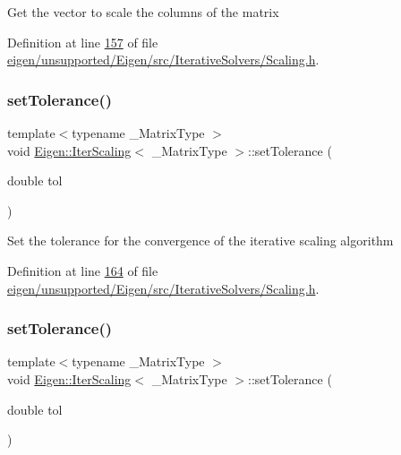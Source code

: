 Get the vector to scale the columns of the matrix 

Definition at line \hyperlink{eigen_2unsupported_2_eigen_2src_2_iterative_solvers_2_scaling_8h_source_l00157}{157} of file \hyperlink{eigen_2unsupported_2_eigen_2src_2_iterative_solvers_2_scaling_8h_source}{eigen/unsupported/\+Eigen/src/\+Iterative\+Solvers/\+Scaling.\+h}.

\mbox{\label{class_eigen_1_1_iter_scaling_acbca5170d8043f40e387bcb6a42f8b71}} 
\subsubsection{\texorpdfstring{set\+Tolerance()}{setTolerance()}\hspace{0.1cm}{\footnotesize\ttfamily [1/2]}}
{\footnotesize\ttfamily template$<$typename \+\_\+\+Matrix\+Type $>$ \\
void \hyperlink{class_eigen_1_1_iter_scaling}{Eigen\+::\+Iter\+Scaling}$<$ \+\_\+\+Matrix\+Type $>$\+::set\+Tolerance (\begin{DoxyParamCaption}\item[{double}]{tol }\end{DoxyParamCaption})\hspace{0.3cm}{\ttfamily [inline]}}

Set the tolerance for the convergence of the iterative scaling algorithm 

Definition at line \hyperlink{eigen_2unsupported_2_eigen_2src_2_iterative_solvers_2_scaling_8h_source_l00164}{164} of file \hyperlink{eigen_2unsupported_2_eigen_2src_2_iterative_solvers_2_scaling_8h_source}{eigen/unsupported/\+Eigen/src/\+Iterative\+Solvers/\+Scaling.\+h}.

\mbox{\label{class_eigen_1_1_iter_scaling_acbca5170d8043f40e387bcb6a42f8b71}} 
\subsubsection{\texorpdfstring{set\+Tolerance()}{setTolerance()}\hspace{0.1cm}{\footnotesize\ttfamily [2/2]}}
{\footnotesize\ttfamily template$<$typename \+\_\+\+Matrix\+Type $>$ \\
void \hyperlink{class_eigen_1_1_iter_scaling}{Eigen\+::\+Iter\+Scaling}$<$ \+\_\+\+Matrix\+Type $>$\+::set\+Tolerance (\begin{DoxyParamCaption}\item[{double}]{tol }\end{DoxyParamCaption})\hspace{0.3cm}{\ttfamily [inline]}}

